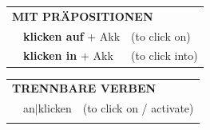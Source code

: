\documentclass[10pt,a4paper]{revtex4-2}
\begin{document}
\begin{verbbox}
\vspace{10pt}

\begin{tabular}{lll}
\multicolumn{3}{l}{\textbf{MIT PRÄPOSITIONEN}}\\
& \textbf{klicken auf} + Akk & (to click on)\\
& \textbf{klicken in} + Akk & (to click into)\\
\end{tabular}
\hfill
\begin{tabular}{lll}
\multicolumn{3}{l}{\textbf{TRENNBARE VERBEN}}\\
& an$|$klicken & (to click on / activate)\\
\vspace{10pt}
\end{tabular}

\vspace{-5pt}
\end{verbbox}
\end{document}

